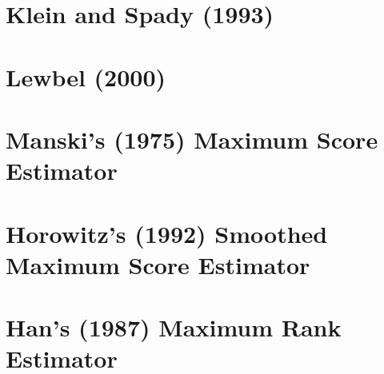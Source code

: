 \documentclass[xcolor=svgnames,dvipdfmx,cjk]{beamer}
\theoremstyle{example}
\begin{document}
\section{Klein and Spady (1993)}
\begin{frame}
  \tableofcontents[currentsection]
\end{frame}









\section{Lewbel (2000)}
\begin{frame}
  \tableofcontents[currentsection]
\end{frame}









\section{Manski's (1975) Maximum Score Estimator}
\begin{frame}
  \tableofcontents[currentsection]
\end{frame}









\section{Horowitz's (1992) Smoothed Maximum Score Estimator}
\begin{frame}
  \tableofcontents[currentsection]
\end{frame}









\section{Han's (1987) Maximum Rank Estimator}
\begin{frame}
  \tableofcontents[currentsection]
\end{frame}
\end{document}
